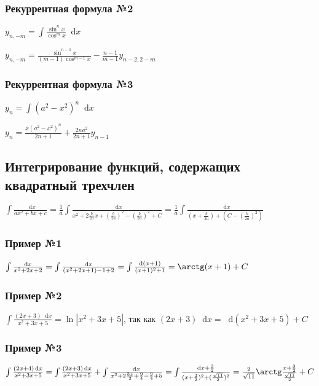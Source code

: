 \documentclass{article}
\newcommand*\diff{\mathop{}\!\mathrm{d}}
\begin{document}
\subsubsection{Рекуррентная формула №2}

$y_{n, - m} = \int \frac{\sin^{n} x}{\cos^{m} x} \diff x$

$y_{n, - m} = \frac{\sin^{n - 1} x}{(m - 1) \cos^{m - 1} x} - \frac{n - 1}{m - 1} y_{n - 2, 2 - m}$

\subsubsection{Рекуррентная формула №3}

$y_{n} = \int (a^2 - x^2)^{n} \diff x$

$y_{n} = \frac{x (a^2 - x^2)^{n}}{2 n + 1} + \frac{2 n a^2}{2 n + 1} y_{n - 1}$

\pagebreak
\subsection{Интегрирование функций, содержащих квадратный трехчлен}

$\int \frac{\diff x}{a x^2 + b x + c} = \frac{1}{a} \int \frac{\diff x}{x^2 + 2 \frac{b}{2 a} x + (\frac{b}{2 a})^2 - (\frac{b}{2 a})^2 + C} = \frac{1}{a} \int \frac{\diff x}{(x + \frac{b}{2 a}) + (C - (\frac{b}{2 a})^2)}$

\subsubsection{Пример №1}

$\int \frac{\diff x}{x^2 + 2x + 2} = \int \frac{\diff x}{(x^2 + 2 x + 1) - 1 + 2} = \int \frac{\diff (x + 1)}{(x + 1)^2 + 1} = \arctg (x + 1) + C$

\subsubsection{Пример №2}

$\int \frac{(2 x + 3) \diff x}{x^2 + 3x + 5} = \ln |x^2 + 3x + 5|$, так как $(2 x + 3) \diff x = \diff (x^2 + 3x + 5) + C$

\subsubsection{Пример №3}

$\int \frac{(2 x + 4) \diff x}{x^2 + 3x + 5} = \int \frac{(2 x + 3) \diff x}{x^2 + 3x + 5} + \int \frac{\diff x}{x^2 + 2 \frac{3 x}{2} + \frac{9}{4} - \frac{9}{4} + 5} = \int \frac{\diff x + \frac{3}{2}}{(x + \frac{3}{2})^2 + (\frac{\sqrt{11}}{2})^{2}} = \frac{2}{\sqrt{11}} \arctg \frac{x + \frac{3}{2}}{\frac{\sqrt{11}}{2}} + C $
\end{document}
